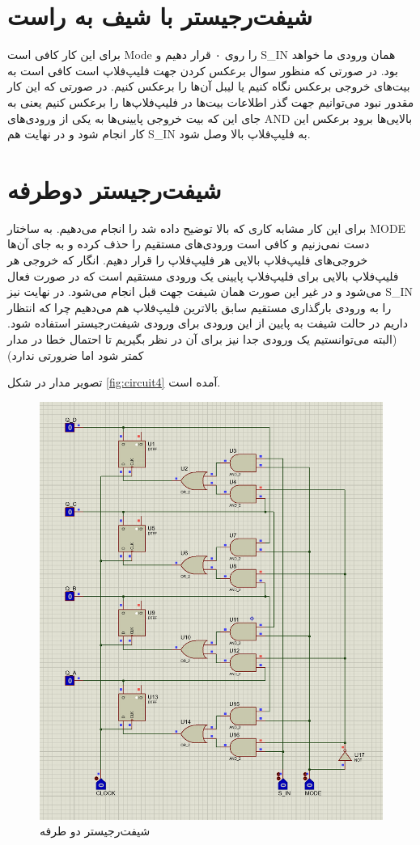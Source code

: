 \section{
شیفت‌رجیستر با شیف به راست
}
برای این کار کافی است
Mode
را روی ۰ قرار دهیم و
S\_IN
همان ورودی ما خواهد بود.
در صورتی که منظور سوال برعکس کردن جهت فلیپ‌فلاپ
است کافی است به بیت‌های خروجی برعکس نگاه کنیم یا لیبل آن‌ها را برعکس کنیم.
در صورتی که این کار مقدور نبود می‌توانیم جهت گذر اطلاعات بیت‌ها در فلیپ‌فلاپ‌ها را برعکس کنیم یعنی به جای این که بیت خروجی پایینی‌ها به یکی از ورودی‌های
AND
بالایی‌ها برود
برعکس این کار انجام شود و در نهایت هم
S\_IN
به فلیپ‌فلاپ بالا وصل شود.

\section{
شیفت‌رجیستر دوطرفه
}
برای این کار مشابه کاری که بالا توضیح داده شد را انجام می‌دهیم.
به ساختار
MODE
دست نمی‌زنیم و کافی است ورودی‌های مستقیم را حذف کرده و به جای آن‌ها خروجی‌های فلیپ‌فلاپ بالایی هر فلیپ‌فلاپ را قرار دهیم.
انگار که خروجی هر فلیپ‌فلاپ بالایی برای فلیپ‌فلاپ پایینی یک ورودی مستقیم است که در صورت
فعال می‌شود و در غیر این صورت همان شیفت جهت قبل انجام می‌شود.
در نهایت نیز
S\_IN
را به ورودی بارگذاری مستقیم سابق بالاترین فلیپ‌فلاپ هم می‌دهیم چرا که انتظار داریم در حالت شیفت به پایین از این ورودی برای ورودی شیفت‌رجیستر استفاده شود.
(البته می‌توانستیم یک ورودی جدا نیز برای آن در نظر بگیریم تا احتمال خطا در مدار کمتر شود اما ضرورتی ندارد)

تصویر مدار در شکل
\eqref{fig:circuit4}
آمده است.

\begin{figure}
    \centering
    \includegraphics[width=\textwidth]{part1/circuit3.png}
    \caption{
    شیفت‌رجیستر دو طرفه
    }
    \label{fig:circuit4}
\end{figure}